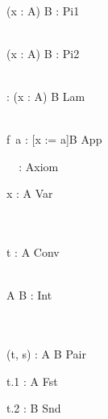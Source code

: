 
\Rule{\PiRuleFpOne}
    {
        \\ 
    }
    {\Gamma \vdash (x : A) \to B : \kind}
    {Pi1}

\Rule{\PiRuleFpTwo}
    {
        \\ 
    }
    {\Gamma \vdash (x : A) \to B : \star}
    {Pi2}

\Rule{\LambdaRuleFp}
    {
        \\ 
    }
    {\Gamma \vdash {} : (x : A) \to B}
    {Lam}

\Rule{\AppRuleFp}
    {
         \\
    }
    {\Gamma \vdash f\ a : [x := a]B}
    {App}

\Rule{\AxiomRuleFp}
    {\textcolor{white}{\_}}
    {\Gamma \vdash \star : \kind}
    {Axiom}

\Rule{\VarRuleFp}
    {
    }
    {\Gamma \vdash x : A}
    {Var}

\Rule{\ConvRuleFp}
    {
         \\
         \\
    }
    {\Gamma \vdash t : A}
    {Conv}

\Rule{\ProductRuleFp}
    {
         \\
    }
    {\Gamma \vdash A \times B : \star}
    {Int}

\Rule{\PairRuleFp}
    {
         \\
         \\
    }
    {\Gamma \vdash (t, s) : A \times B }
    {Pair}

\Rule{\FirstRuleFp}
    {}
    {\Gamma \vdash t.1 : A}
    {Fst}

\Rule{\SecondRuleFp}
    {}
    {\Gamma \vdash t.2 : B}
    {Snd}

